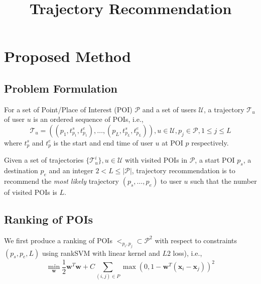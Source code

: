 \documentclass{sig-alternate-05-2015}
\begin{document}

\title{Trajectory Recommendation}


\maketitle




\section{Proposed Method}


\subsection{Problem Formulation}
\label{sec:formulation}
For a set of Point/Place of Interest (POI) $\mathcal{P}$ and a set of users $\mathcal{U}$,
a trajectory $\mathcal{T}_u$ of user $u$ is an ordered sequence of POIs,
i.e.,
\begin{displaymath}
    \mathcal{T}_u = ((p_1, t_{p_1}^s, t_{p_{1}}^e), \dots, (p_L, t_{p_L}^s, t_{p_L}^e)), 
    u \in \mathcal{U}, 
    p_j \in \mathcal{P}, 1 \le j \le L
\end{displaymath}
where $t_p^s$ and $t_p^e$ is the start and end time of user $u$ at POI $p$ respectively.

Given a set of trajectories $\{ \mathcal{T}_u^i \}, u \in \mathcal{U}$ with visited POIs in $\mathcal{P}$, 
a start POI $p_s$, a destination $p_e$ and an integer $2 < L \le |\mathcal{P}|$,
trajectory recommendation is to recommend the \textit{most likely} trajectory $(p_s, \dots, p_e)$ to user $u$ such that
the number of visited POIs is $L$.


\subsection{Ranking of POIs}
We first produce a ranking of POIs $<_{p_i, p_j} \subset \mathcal{P}^2$ with respect to constraints $(p_s, p_e, L)$ 
using rankSVM with linear kernel and $L2$ loss)\cite{lranksvm}, 
i.e.,
\begin{displaymath}
\min_{\mathbf{w}} \frac{1}{2} \mathbf{w}^T \mathbf{w} +
                  C \sum_{(i, j) \in P} \max \left( 0, 1 - \mathbf{w}^T (\mathbf{x}_i - \mathbf{x}_j) \right)^2
\end{displaymath}
\end{document}
